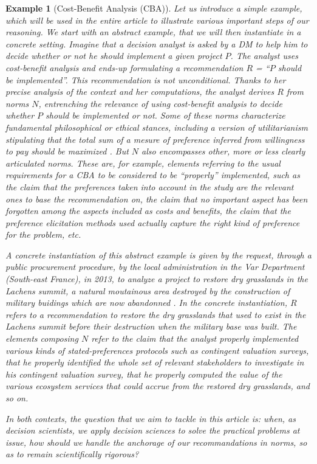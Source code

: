 \documentclass[preprint, french, english, 11pt, authoryear]{elsarticle}%
\newtheorem{example}{Example}
\begin{document}
\begin{example}[Cost-Benefit Analysis (CBA)]
Let us introduce a simple example, which will be used in the entire article to illustrate various important steps of our reasoning. %
We start with an abstract example, that we will then instantiate in a concrete setting. Imagine that a decision analyst is asked by a \ac{DM} to help him to decide whether or not he should implement a given project $P$.
The analyst uses cost-benefit analysis \citep{layard_cost-benefit_1994} and ends-up formulating a recommendation $R$ = “$P$ should be implemented”.
This recommendation is not unconditional. Thanks to her precise analysis of the context and her computations, the analyst derives $R$ from norms $N$, entrenching the relevance of using cost-benefit analysis to decide whether $P$ should be implemented or not. Some of these norms characterize fundamental philosophical or ethical stances, including a version of utilitarianism stipulating that the total sum of a mesure of preference inferred from willingness to pay should be maximized \citep{meinard_ethical_2016}. 
But $N$ also encompasses other, more or less clearly articulated norms. These are, for example, elements referring to the usual requirements for a CBA to be considered to be ``properly'' implemented, such as the claim that the preferences taken into account in the study are the relevant ones to base the recommendation on, the claim that no important aspect has been forgotten among the aspects included as costs and benefits, the claim that the preference elicitation methods used actually capture the right kind of preference for the problem, etc.

A concrete instantiation of this abstract example is given by the request, through a public procurement procedure, by the local administration in the Var Department (South-east France), in 2013, to analyze a project to restore dry grasslands in the Lachens summit, a natural moutainous area destroyed by the construction of military buidings which are now abandonned \citep{meinard_etude_2015}.
In the concrete instantiation, $R$ refers to a recommendation to restore the dry grasslands that used to exist in the Lachens summit before their destruction when the military base was built. 
The elements composing $N$ refer to the claim that the analyst properly implemented various kinds of stated-preferences protocols such as contingent valuation surveys, that he properly identified the whole set of relevant stakeholders to investigate in his contingent valuation survey, that he properly computed the value of the various ecosystem services that could accrue from the restored dry grasslands, and so on.

In both contexts, the question that we aim to tackle in this article is: when, as decision scientists, we apply decision sciences to solve the practical problems at issue, how should we handle the anchorage of our recommandations in norms, so as to remain scientifically rigorous? 
\end{example}
\end{document}
